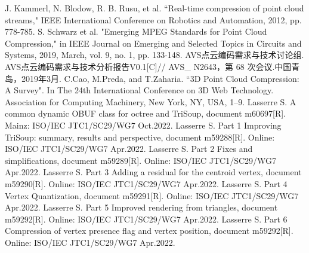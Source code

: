 %
%
\begin{thebibliography}{99}
    J. Kammerl, N. Blodow, R. B. Rusu, et al. ``Real-time compression of point cloud streams," IEEE International Conference on Robotics and Automation, 2012, pp. 778-785.
    S. Schwarz et al. "Emerging MPEG Standards for Point Cloud Compression," in IEEE Journal on Emerging and Selected Topics in Circuits and Systems, 2019, March, vol. 9, no. 1, pp. 133-148.
    AVS点云编码需求与技术讨论组. AVS点云编码需求与技术分析报告V0.1[C]// AVS\_ N2643，第 68 次会议.中国青岛，2019年3月.
    C.Cao, M.Preda, and T.Zaharia. ``3D Point Cloud Compression: A Survey". In The 24th International Conference on 3D Web Technology. Association for Computing Machinery, New York, NY, USA, 1–9.
    Lasserre S. A common dynamic OBUF class for octree and TriSoup, document m60697[R]. Mainz: ISO/IEC JTC1/SC29/WG7 Oct.2022.
    Lasserre S. Part 1 Improving TriSoup: summary, results and perspective, document m59288[R]. Online: ISO/IEC JTC1/SC29/WG7 Apr.2022.
    Lasserre S. Part 2 Fixes and simplifications, document m59289[R]. Online: ISO/IEC JTC1/SC29/WG7 Apr.2022.
    Lasserre S. Part 3 Adding a residual for the centroid vertex, document m59290[R]. Online: ISO/IEC JTC1/SC29/WG7 Apr.2022.
    Lasserre S. Part 4 Vertex Quantization, document m59291[R]. Online: ISO/IEC JTC1/SC29/WG7 Apr.2022.
    Lasserre S. Part 5 Improved rendering from triangles, document m59292[R]. Online: ISO/IEC JTC1/SC29/WG7 Apr.2022.
    Lasserre S. Part 6 Compression of vertex presence flag and vertex position, document m59292[R]. Online: ISO/IEC JTC1/SC29/WG7 Apr.2022.

\end{thebibliography}
